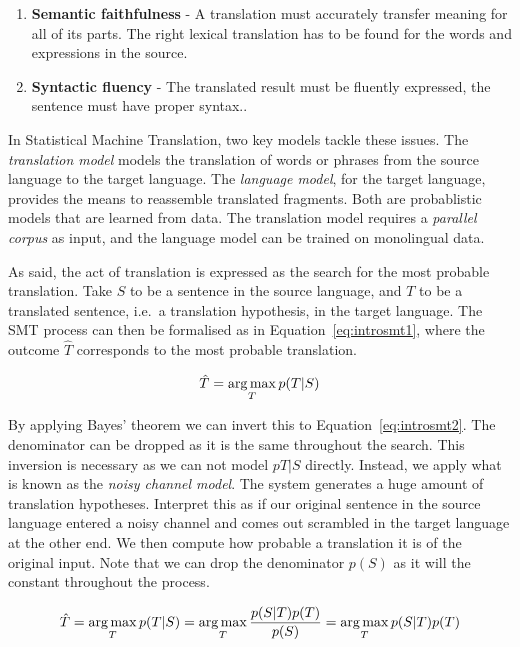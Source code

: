 \begin{enumerate}
	\item \textbf{Semantic faithfulness} - A translation must accurately transfer meaning for all of its parts. The right lexical translation has to be found for the words and expressions in the source.
	\item \textbf{Syntactic fluency} - The translated result must be fluently expressed, the sentence must have proper syntax..
\end{enumerate}

In Statistical Machine Translation, two key models tackle these issues. The
\emph{translation model} models the translation of words or phrases from the
source language to the target language. The \emph{language model}, for the
target language, provides the means to reassemble translated fragments. Both
are probablistic models that are learned from data. The translation model
requires a \emph{parallel corpus} as input, and the language model can be
trained on monolingual data.

As said, the act of translation is expressed as the search for the most
probable translation. Take $S$ to be a sentence in the source language, and $T$
to be a translated sentence, i.e.\ a translation hypothesis, in the target
language. The SMT process can then be formalised as in
Equation~\ref{eq:introsmt1}, where the outcome $\hat{T}$ corresponds to the most probable translation.

\begin{equation}
\hat{T} = \operatorname*{arg\,max}_T p(T|S) 
\label{eq:introsmt1}
\end{equation}

By applying Bayes' theorem we can invert this to Equation~\ref{eq:introsmt2}.
The denominator can be dropped as it is the same throughout the search. This
inversion is necessary as we can not model $p{T|S}$ directly. Instead, we apply
what is known as the \emph{noisy channel model}. The system generates a huge
amount of translation hypotheses. Interpret this as if our original sentence in
the source language entered a noisy channel and comes out scrambled in the
target language at the other end. We then compute how probable a translation it
is of the original input. Note that we can drop the denominator $p(S)$ as it
will the constant throughout the process.

\begin{equation}
\hat{T} = \operatorname*{arg\,max}_T p(T|S) = \operatorname*{arg\,max}_T \frac{p(S|T)p(T)}{p(S)} = \operatorname*{arg\,max}_T p(S|T)p(T)
\label{eq:introsmt2}
\end{equation}

